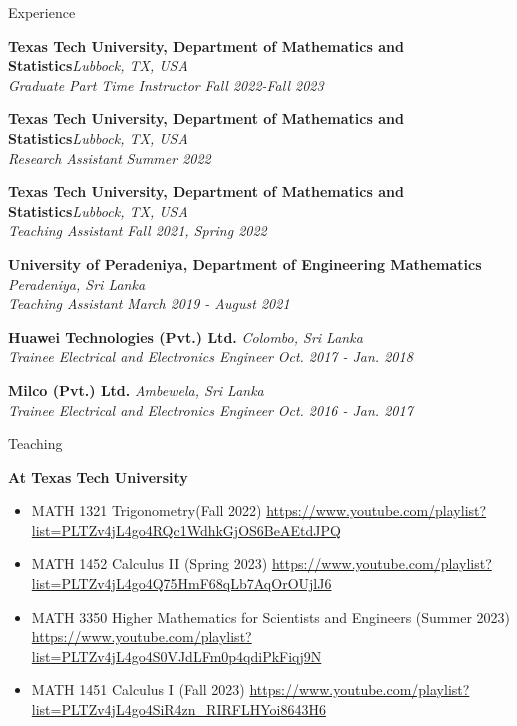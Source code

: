 \documentclass{resume} %
\begin{document}
\begin{rSection}{Experience}

{\bf Texas Tech University, Department of Mathematics and Statistics}\hfill{\em Lubbock, TX, USA}
\\ \textit{Graduate Part Time Instructor} \hfill{\em Fall 2022-Fall 2023 }

{\bf Texas Tech University, Department of Mathematics and Statistics}\hfill{\em Lubbock, TX, USA}
\\ \textit{Research Assistant} \hfill{\em Summer 2022 }

{\bf Texas Tech University, Department of Mathematics and Statistics}\hfill{\em Lubbock, TX, USA}
\\ \textit{Teaching Assistant} \hfill{\em Fall 2021, Spring 2022 }


{\bf University of Peradeniya, Department of Engineering Mathematics} \hfill {\em Peradeniya, Sri Lanka}
\\\textit{Teaching Assistant} \hfill {\em March 2019 - August 2021}




{\bf Huawei Technologies (Pvt.) Ltd. } \hfill {\em Colombo, Sri Lanka}
\\\textit{Trainee Electrical and Electronics Engineer } \hfill {\em Oct. 2017 - Jan. 2018 }


{\bf Milco (Pvt.) Ltd.} \hfill {\em Ambewela, Sri Lanka}
\\\textit{Trainee Electrical and Electronics Engineer } \hfill {\em Oct. 2016 - Jan. 2017 }


\begin{rSection}{Teaching}

\textbf{At Texas Tech University} 
\begin{itemize}
    \item MATH 1321 Trigonometry(Fall 2022)
    \newline \url{https://www.youtube.com/playlist?list=PLTZv4jL4go4RQc1WdhkGjOS6BeAEtdJPQ} 
    \item MATH 1452 Calculus II (Spring 2023)
    \newline \url{https://www.youtube.com/playlist?list=PLTZv4jL4go4Q75HmF68qLb7AqOrOUjlJ6}
    \item MATH 3350 Higher Mathematics for Scientists and Engineers (Summer 2023)
    \newline \url{https://www.youtube.com/playlist?list=PLTZv4jL4go4S0VJdLFm0p4qdiPkFiqj9N}

    \item MATH 1451 Calculus I (Fall 2023)
    \newline \url{https://www.youtube.com/playlist?list=PLTZv4jL4go4SiR4zn_RIRFLHYoi8643H6}
\end{itemize}


\end{rSection}
\end{rSection}
\end{document}
